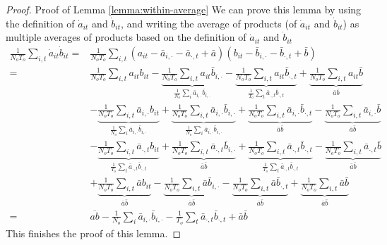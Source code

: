 \begin{proof}{Proof of Lemma \ref{lemma:within-average}}
We can prove this lemma by using the definition of $\dot{a}_{it}$ and $\dot{b}_{it}$, and writing the average of products (of $\dot{a}_{it} $ and $\dot{b}_{it}$) as multiple averages of products based on the definition of $\dot{a}_{it}$ and $\dot{b}_{it}$
    \begin{align*}
    \frac{1}{N_o T_o}\sum_{i, t} \dot{a}_{it} \dot{b}_{it} =& \frac{1}{N_o T_o}\sum_{i, t} \left(a_{it} - \bar{a}_{i,\cdot} -  \bar{a}_{\cdot,t} + \bar{a}\right) \left(b_{it} - \bar{b}_{i,\cdot} -  \bar{b}_{\cdot,t} + \bar{b}\right)  \\
    =& \frac{1}{N_o T_o}\sum_{i, t} a_{it} b_{it} - \underbrace{\frac{1}{N_o T_o}\sum_{i, t} a_{it}  \bar{b}_{i,\cdot}}_{\frac{1}{N_o }\sum_{i} \bar{a}_{i,\cdot} \bar{b}_{i,\cdot}}  - \underbrace{\frac{1}{N_o T_o}\sum_{i, t} a_{it}  \bar{b}_{\cdot,t}}_{\frac{1}{T_o}\sum_{t} \bar{a}_{\cdot,t}  \bar{b}_{\cdot,t}}  + \underbrace{\frac{1}{N_o T_o}\sum_{i, t} a_{it}  \bar{b}}_{\bar{a} \bar{b}}  \\
    & - \underbrace{\frac{1}{N_o T_o}\sum_{i, t}  \bar{a}_{i,\cdot} b_{it}}_{\frac{1}{N_o }\sum_{i} \bar{a}_{i,\cdot} \bar{b}_{i,\cdot}} + \underbrace{\frac{1}{N_o T_o}\sum_{i, t}  \bar{a}_{i,\cdot} \bar{b}_{i,\cdot}}_{\frac{1}{N_o }\sum_{i} \bar{a}_{i,\cdot} \bar{b}_{i,\cdot}}  + \underbrace{\frac{1}{N_o T_o}\sum_{i, t}  \bar{a}_{i,\cdot} \bar{b}_{\cdot,t}}_{\bar{a}  \bar{b}}  - \underbrace{\frac{1}{N_o T_o}\sum_{i, t}  \bar{a}_{i,\cdot} \bar{b}}_{\bar{a}  \bar{b}}  \\
    & - \underbrace{\frac{1}{N_o T_o}\sum_{i, t}  \bar{a}_{\cdot,t} b_{it}}_{\frac{1}{T_o}\sum_{t} \bar{a}_{\cdot,t}  \bar{b}_{\cdot,t}}  + \underbrace{\frac{1}{N_o T_o}\sum_{i, t}  \bar{a}_{\cdot,t} \bar{b}_{i,\cdot}}_{\bar{a}  \bar{b}}  + \underbrace{\frac{1}{N_o T_o}\sum_{i, t}  \bar{a}_{\cdot,t} \bar{b}_{\cdot,t}}_{\frac{1}{T_o}\sum_{t} \bar{a}_{\cdot,t}  \bar{b}_{\cdot,t}}  - \underbrace{\frac{1}{N_o T_o}\sum_{i, t}  \bar{a}_{\cdot,t} \bar{b}}_{\bar{a}  \bar{b}}  \\
    & + \underbrace{\frac{1}{N_o T_o}\sum_{i, t} \bar{a} b_{it}}_{\bar{a}  \bar{b}}  - \underbrace{\frac{1}{N_o T_o}\sum_{i, t} \bar{a}  \bar{b}_{i,\cdot}}_{\bar{a}  \bar{b}}  - \underbrace{\frac{1}{N_o T_o}\sum_{i, t} \bar{a}  \bar{b}_{\cdot,t}}_{\bar{a}  \bar{b}}  + \underbrace{\frac{1}{N_o T_o}\sum_{i, t} \bar{a}  \bar{b}}_{\bar{a}  \bar{b}}  \\
    =& \overline{ab} - \frac{1}{N_o} \sum_i \bar{a}_{i,\cdot} \bar{b}_{i,\cdot} - \frac{1}{T_o} \sum_t \bar{a}_{\cdot,t} \bar{b}_{\cdot,t} + \bar{a} \bar{b}
\end{align*}
This finishes the proof of this lemma. \halmos
\end{proof}

